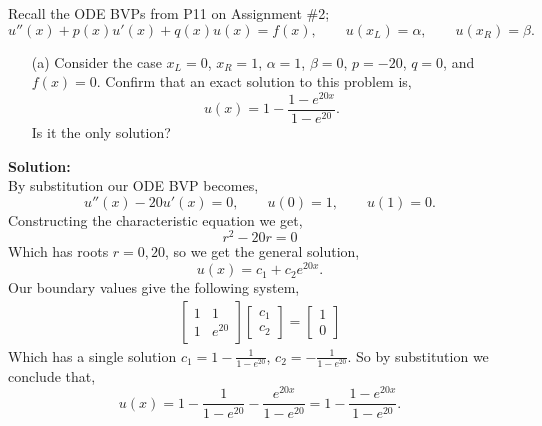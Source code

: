 \documentclass[12pt]{article}
\makeatletter
\theoremstyle{homework}
\newenvironment{exercise}[1]
{\def\@currentlabel{#1}\exercisecore}
{\endexercisecore}
\newcommand{\localhead}[1]{\par\smallskip\noindent\textbf{#1}\nobreak\\}%
\newcommand\solution{\localhead{Solution:}}
\makeatother
\begin{document}
\vspace{1in}







\begin{exercise}{Problem P20} Recall the ODE BVPs from P11 on Assignment \#2;
  \begin{equation*}
    u''(x) + p(x)u'(x) + q(x)u(x) = f(x), \qquad u(x_L) = \alpha, \qquad u(x_R) = \beta.
  \end{equation*}
  
  \begin{enumerate}
    \item[(a)] Consider the case $x_L = 0$, $x_R = 1$, $\alpha = 1$, $\beta = 0$, $p = -20$, $q = 0$, and 
    $f(x) = 0$. Confirm that an exact solution to this problem is, 
    \begin{equation*}
      u(x) = 1 - \frac{1 - e^{20x}}{1 - e^{20}}.
    \end{equation*}
    Is it the only solution?
  \end{enumerate}
  \solution By substitution our ODE BVP becomes, 
  \begin{equation*}
    u''(x) - 20u'(x) = 0, \qquad u(0) = 1, \qquad u(1) = 0.
  \end{equation*}
  Constructing the characteristic equation we get, 
  \begin{equation*}
    r^2 - 20r = 0
  \end{equation*}
  Which has roots $r = 0, 20$, so we get the general solution, 
  \begin{equation*}
    u(x) = c_1 + c_2e^{20x}. 
  \end{equation*}
  Our boundary values give the following system,
  \begin{align*}
    \begin{bmatrix}
      1 & 1\\
      1 & e^{20}
    \end{bmatrix}
    \begin{bmatrix}
      c_1\\
      c_2
    \end{bmatrix} = 
    \begin{bmatrix}
      1\\
      0
    \end{bmatrix}
  \end{align*}
  Which has a single solution $c_1 = 1 - \frac{1}{1 - e^{20}}$, $c_2 = - \frac{1}{1 - e^{20}}$. So by substitution we conclude that, 
  \begin{equation*}
    u(x) = 1 - \frac{1}{1 - e^{20}} - \frac{e^{20x}}{1 - e^{20}} = 1 - \frac{1 - e^{20x}}{1 - e^{20}}.
  \end{equation*}
  \vspace{.15in}



\end{exercise}
\end{document}
